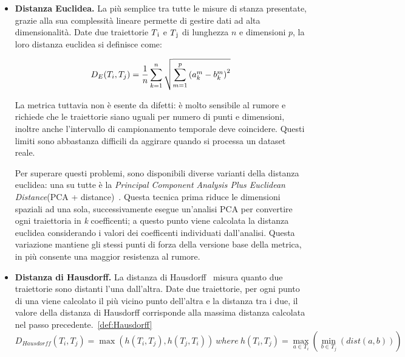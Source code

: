 \begin{itemize}

  \item \textbf{Distanza Euclidea.}
  La più semplice tra tutte le misure di stanza presentate, grazie alla sua complessità lineare permette di gestire dati ad alta dimensionalità.
  Date due traiettorie  \(T\textsubscript{i}\) e  \(T\textsubscript{j}\) di lunghezza \(n\) e dimensioni \(p\), la loro distanza euclidea si definisce come:

  \begin{equation}
    {D_E(T_{i}, T_{j}) = { {1 \over n} \sum_{k=1}^{n} {\sqrt{\sum_{m=1}^{p}{(a_{k}^{m} - b_{k}^{m})}^2}}}}
  \end{equation}

  La metrica tuttavia non è esente da difetti: è molto sensibile al rumore e richiede che le traiettorie siano uguali per numero di punti
  e dimensioni, inoltre anche l'intervallo di campionamento temporale deve coincidere. Questi limiti sono abbastanza difficili da
  aggirare quando si processa un dataset reale.

  Per superare questi problemi, sono disponibili diverse varianti della distanza euclidea: una su tutte è la \textit{Principal Component Analysis Plus Euclidean Distance}(PCA + distance)~\cite{zhang2006comparison}.
  Questa tecnica prima riduce le dimensioni spaziali ad una sola, successivamente esegue un'analisi PCA per convertire ogni traiettoria in
  \textit{k} coefficenti; a questo punto viene calcolata la distanza euclidea considerando i valori dei coefficenti individuati dall'analisi.
  Questa variazione mantiene gli stessi punti di forza della versione base della metrica, in più consente una maggior resistenza al rumore.



  \item \textbf{Distanza di Hausdorff.}
  La distanza di Hausdorff~\cite{chen2011clustering} misura quanto due traiettorie sono distanti l'una dall'altra.
  Date due traiettorie, per ogni punto di una viene calcolato il più vicino punto dell'altra e la distanza tra i due, il valore della distanza di Hausdorff
  corrisponde alla massima distanza calcolata nel passo precedente.~\cref{def:Hausdorff}
  \begin{equation} \label{def:Hausdorff}
    {D_{Hausdorff}(T_{i}, T_{j}) = \max{(h(T_{i}, T_{j}), h(T_{j}, T_{i}))}}~where~{h(T_{i}, T_{j}) = \max_{a \in T_{i}}{(\min_{b \in T_{j}}{(dist(a,b))})}}
  \end{equation}


\end{itemize}
